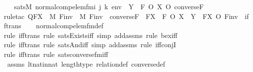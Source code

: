 \begin{isabellebody}
\ \ \ {\isachardoublequoteopen}sats{\isacharparenleft}{\kern0pt}M{\isacharcomma}{\kern0pt}\ normal{\isacharunderscore}{\kern0pt}comp{\isacharunderscore}{\kern0pt}elem{\isacharunderscore}{\kern0pt}fm{\isacharparenleft}{\kern0pt}i{\isacharcomma}{\kern0pt}\ j{\isacharcomma}{\kern0pt}\ k{\isacharparenright}{\kern0pt}{\isacharcomma}{\kern0pt}\ env{\isacharparenright}{\kern0pt}\ {\isasymlongleftrightarrow}\ Y\ {\isacharequal}{\kern0pt}\ F\ O\ X\ O\ converse{\isacharparenleft}{\kern0pt}F{\isacharparenright}{\kern0pt}{\isachardoublequoteclose}\ \isanewline
%
\isadelimproof
\ \ %
\endisadelimproof
%
\isatagproof
{}\isamarkupfalse%
{\isacharparenleft}{\kern0pt}rule{\isacharunderscore}{\kern0pt}tac\ Q{\isacharequal}{\kern0pt}{\isachardoublequoteopen}{\isasymexists}FX\ {\isasymin}\ M{\isachardot}{\kern0pt}\ {\isasymexists}Finv\ {\isasymin}\ M{\isachardot}{\kern0pt}\ Finv\ {\isacharequal}{\kern0pt}\ converse{\isacharparenleft}{\kern0pt}F{\isacharparenright}{\kern0pt}\ {\isasymand}\ FX\ {\isacharequal}{\kern0pt}\ F\ O\ X\ {\isasymand}\ Y\ {\isacharequal}{\kern0pt}\ FX\ O\ Finv{\isachardoublequoteclose}\ \ iff{\isacharunderscore}{\kern0pt}trans{\isacharparenright}{\kern0pt}\isanewline
\ \ \isamarkupfalse%
\ normal{\isacharunderscore}{\kern0pt}comp{\isacharunderscore}{\kern0pt}elem{\isacharunderscore}{\kern0pt}fm{\isacharunderscore}{\kern0pt}def\ \isanewline
\ \ \isamarkupfalse%
{\isacharparenleft}{\kern0pt}rule\ iff{\isacharunderscore}{\kern0pt}trans{\isacharcomma}{\kern0pt}\ rule\ sats{\isacharunderscore}{\kern0pt}Exists{\isacharunderscore}{\kern0pt}iff{\isacharcomma}{\kern0pt}\ simp\ add{\isacharcolon}{\kern0pt}assms{\isacharcomma}{\kern0pt}\ rule\ bex{\isacharunderscore}{\kern0pt}iff{\isacharparenright}{\kern0pt}{\isacharplus}{\kern0pt}\isanewline
\ \ \isamarkupfalse%
{\isacharparenleft}{\kern0pt}rule\ iff{\isacharunderscore}{\kern0pt}trans{\isacharcomma}{\kern0pt}\ rule\ sats{\isacharunderscore}{\kern0pt}And{\isacharunderscore}{\kern0pt}iff{\isacharcomma}{\kern0pt}\ simp\ add{\isacharcolon}{\kern0pt}assms{\isacharcomma}{\kern0pt}\ rule\ iff{\isacharunderscore}{\kern0pt}conjI{}{\isacharparenright}{\kern0pt}\isanewline
\ \ \ \isamarkupfalse%
{\isacharparenleft}{\kern0pt}rule\ iff{\isacharunderscore}{\kern0pt}trans{\isacharcomma}{\kern0pt}\ rule\ sats{\isacharunderscore}{\kern0pt}converse{\isacharunderscore}{\kern0pt}fm{\isacharunderscore}{\kern0pt}iff{\isacharparenright}{\kern0pt}\isanewline
\ \ \isamarkupfalse%
\ assms\ lt{\isacharunderscore}{\kern0pt}nat{\isacharunderscore}{\kern0pt}in{\isacharunderscore}{\kern0pt}nat\ length{\isacharunderscore}{\kern0pt}type\ relation{\isacharunderscore}{\kern0pt}def\ converse{\isacharunderscore}{\kern0pt}def\isanewline

\end{isabellebody}
